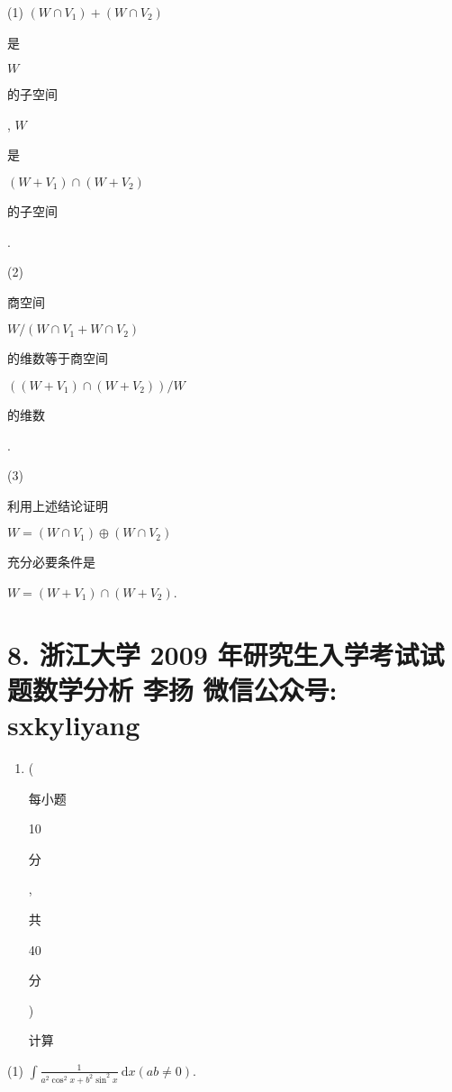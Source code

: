 \documentclass[10pt]{article}
\begin{document}
(1) $\left(W \cap V_{1}\right)+\left(W \cap V_{2}\right)$ \begin{CJK}{UTF8}{mj}是\end{CJK} $W$ \begin{CJK}{UTF8}{mj}的子空间\end{CJK}, $W$ \begin{CJK}{UTF8}{mj}是\end{CJK} $\left(W+V_{1}\right) \cap\left(W+V_{2}\right)$ \begin{CJK}{UTF8}{mj}的子空间\end{CJK}.

(2) \begin{CJK}{UTF8}{mj}商空间\end{CJK} $W /\left(W \cap V_{1}+W \cap V_{2}\right)$ \begin{CJK}{UTF8}{mj}的维数等于商空间\end{CJK} $\left(\left(W+V_{1}\right) \cap\left(W+V_{2}\right)\right) / W$ \begin{CJK}{UTF8}{mj}的维数\end{CJK}.

(3) \begin{CJK}{UTF8}{mj}利用上述结论证明\end{CJK} $W=\left(W \cap V_{1}\right) \oplus\left(W \cap V_{2}\right)$ \begin{CJK}{UTF8}{mj}充分必要条件是\end{CJK} $W=\left(W+V_{1}\right) \cap\left(W+V_{2}\right)$.

\section{8. 浙江大学 2009 年研究生入学考试试题数学分析 
 李扬 
 微信公众号: sxkyliyang}
\begin{enumerate}
  \item (\begin{CJK}{UTF8}{mj}每小题\end{CJK} 10 \begin{CJK}{UTF8}{mj}分\end{CJK}, \begin{CJK}{UTF8}{mj}共\end{CJK} 40 \begin{CJK}{UTF8}{mj}分\end{CJK}) \begin{CJK}{UTF8}{mj}计算\end{CJK}
\end{enumerate}
(1) $\int \frac{1}{a^{2} \cos ^{2} x+b^{2} \sin ^{2} x} \mathrm{~d} x(a b \neq 0)$.
\end{document}
